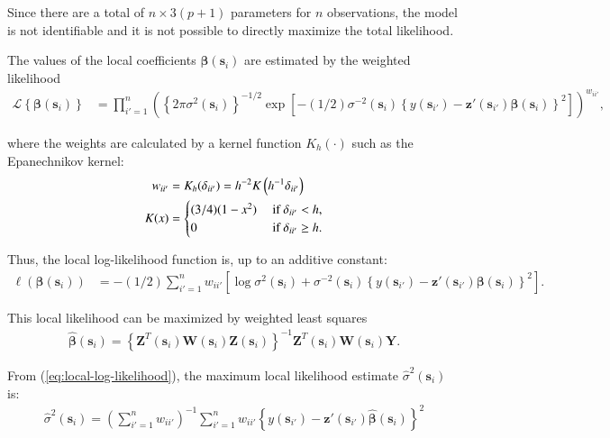 \documentclass[authoryear, review, 11pt]{elsarticle}
\begin{document}
    Since there are a total of $n \times 3(p+1)$ parameters for $n$ observations, the model is not identifiable and it is not possible to directly maximize the total likelihood.
  
    The values of the local coefficients $\bm{\beta}(\bm{s}_i)$ are estimated by the weighted likelihood
    \begin{align}\label{eq:local-likelihood}
        \mathcal{L} \left\{ \bm{\beta}(\bm{s}_i) \right\} &= \prod_{i'=1}^n \left( \left\{ 2 \pi \sigma^2(\bm{s}_i)  \right\}^{-1/2}  \exp \left[- (1/2) \sigma^{-2}(\bm{s}_i)  \left\{ y(\bm{s}_{i'}) - \bm{z}'(\bm{s}_{i'}) \bm{\beta}(\bm{s}_i) \right\}^2 \right] \right) ^ {w_{ii'}},
    \end{align}
  
    where the weights are calculated by a kernel function $K_h(\cdot)$ such as the Epanechnikov kernel:
    \begin{align}\label{eq:epanechnikov}
        w_{ii'} &= K_h(\delta_{ii'}) = h^{-2} K\left( h^{-1} \delta_{ii'} \right) \notag \\
        K(x) &= \begin{cases} (3/4) (1-x^2) &\mbox{ if } \delta_{ii'} < h, \\ 0 &\mbox{ if } \delta_{ii'} \geq h. \end{cases}
    \end{align}
  
    Thus, the local log-likelihood function is, up to an additive constant: 
    \begin{align}\label{eq:local-log-likelihood}
        \ell\left(\bm{\beta}(\bm{s}_i)\right) &= -(1/2) \sum_{i'=1}^n w_{ii'} \left[ \log{\sigma^2(\bm{s}_i)}  + \sigma^{-2}(\bm{s}_i)  \left\{y(\bm{s}_{i'}) - \bm{z}'(\bm{s}_{i'}) \bm{\beta}(\bm{s}_i) \right\}^2 \right].
    \end{align}
  
    This local likelihood can be maximized by weighted least squares
    \begin{align}\label{eq:beta-hat}
        \hat{\bm{\beta}}(\bm{s}_i) = \left\{ \bm{Z}^T(\bm{s}_i) \bm{W}(\bm{s}_i) \bm{Z}(\bm{s}_i) \right\}^{-1} \bm{Z}^T(\bm{s}_i) \bm{W}(\bm{s}_i) \bm{Y}.
    \end{align}
	
    From (\ref{eq:local-log-likelihood}), the maximum local likelihood estimate $\hat{\sigma}^2(\bm{s}_i)$ is:	 
    \begin{align}
        \hat{\sigma}^2(\bm{s}_i) = \left(\sum \limits_{i'=1}^{n} w_{ii'} \right)^{-1} \sum \limits_{i'=1}^n w_{ii'} \left\{ y(\bm{s}_{i'}) - \bm{z}'(\bm{s}_{i'}) \hat{\bm{\beta}}(\bm{s}_i) \right\}^2
    \end{align}
\end{document}
